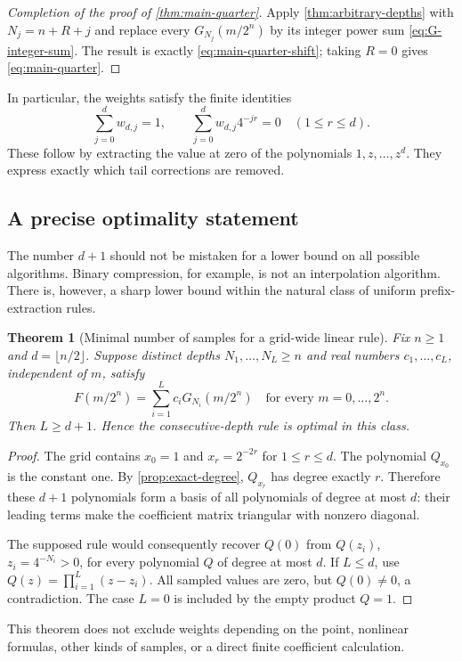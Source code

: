 \documentclass[11pt,a4paper]{article}
\numberwithin{equation}{section}
\newtheorem{theorem}{Theorem}[section]
\theoremstyle{definition}
\theoremstyle{remark}
\begin{document}
\begin{proof}[Completion of the proof of \cref{thm:main-quarter}]
Apply \cref{thm:arbitrary-depths} with $N_j=n+R+j$ and replace every $G_{N_j}(m/2^n)$ by its integer power sum \cref{eq:G-integer-sum}. The result is exactly \cref{eq:main-quarter-shift}; taking $R=0$ gives \cref{eq:main-quarter}.
\end{proof}

In particular, the weights satisfy the finite identities
\begin{equation}
 \sum_{j=0}^{d}w_{d,j}=1,\qquad
 \sum_{j=0}^{d}w_{d,j}4^{-jr}=0\quad(1\le r\le d).
 \label{eq:annihilation}
\end{equation}
These follow by extracting the value at zero of the polynomials $1,z,\ldots,z^d$. They express exactly which tail corrections are removed.

\subsection{A precise optimality statement}
The number $d+1$ should not be mistaken for a lower bound on all possible algorithms. Binary compression, for example, is not an interpolation algorithm. There is, however, a sharp lower bound within the natural class of uniform prefix-extraction rules.

\begin{theorem}[Minimal number of samples for a grid-wide linear rule]
\label{thm:minimal}
Fix $n\ge1$ and $d=\lfloor n/2\rfloor$. Suppose distinct depths $N_1,\ldots,N_L\ge n$ and real numbers $c_1,\ldots,c_L$, independent of $m$, satisfy
\[
 F(m/2^n)=\sum_{i=1}^{L}c_iG_{N_i}(m/2^n)
 \quad\text{for every }m=0,\ldots,2^n.
\]
Then $L\ge d+1$. Hence the consecutive-depth rule is optimal in this class.
\end{theorem}
\begin{proof}
The grid contains $x_0=1$ and $x_r=2^{-2r}$ for $1\le r\le d$. The polynomial $Q_{x_0}$ is the constant one. By \cref{prop:exact-degree}, $Q_{x_r}$ has degree exactly $r$. Therefore these $d+1$ polynomials form a basis of all polynomials of degree at most $d$: their leading terms make the coefficient matrix triangular with nonzero diagonal.

The supposed rule would consequently recover $Q(0)$ from $Q(z_i)$, $z_i=4^{-N_i}>0$, for every polynomial $Q$ of degree at most $d$. If $L\le d$, use $Q(z)=\prod_{i=1}^{L}(z-z_i)$. All sampled values are zero, but $Q(0)\ne0$, a contradiction. The case $L=0$ is included by the empty product $Q=1$.
\end{proof}
This theorem does not exclude weights depending on the point, nonlinear formulas, other kinds of samples, or a direct finite coefficient calculation.
\end{document}
